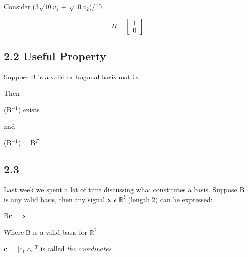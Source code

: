 \documentclass[11pt]{article}
\begin{document}
\vspace{4mm}

Consider (3$\sqrt{10}v_1$ + $\sqrt{10}v_2$)/10 =

\begin{center}
\[
B = 
\begin{bmatrix}
   1 \\
 0
\end{bmatrix}
\]
\end{center}

\vspace{5mm}

\subsection*{2.2 \hspace{3mm} Useful Property}
Suppose B is a valid orthogonal basis matrix

\vspace{3mm}
Then
\begin{center}

 (B$^{-1}$) exists

\end{center}
and
\begin{center}

 (B$^{-1}$) = B$^{T}$

\end{center}



\vspace{5mm}

\subsection*{2.3}
Last week we spent a lot of time discussing what constitutes a basis. Suppose B is any valid basis, then any signal \textbf{x} $\epsilon$ $\mathbb{R}^{2}$ (length 2) can be expressed:

\vspace{3mm}
\begin{center}

B$\textbf{c}$ = \textbf{x}

\end{center}
\vspace{3mm}
\begin{center}
Where B is a valid basis for $\mathbb{R}^{2}$
\end{center}
\begin{center}
\textbf{c} = [$c_1$ $c_2$]$^{T}$ is called \emph{the coordinates}
\end{center}
\end{document}
